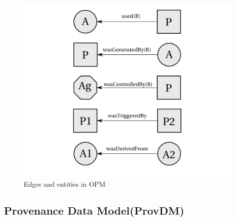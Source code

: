 \begin{figure}
\begin{center}

\includegraphics{opm_convention.PNG}
\end{center}
\caption{Edges and entities in OPM}
\label{autom}
\end{figure}


\subsection{Provenance Data Model(ProvDM)}

